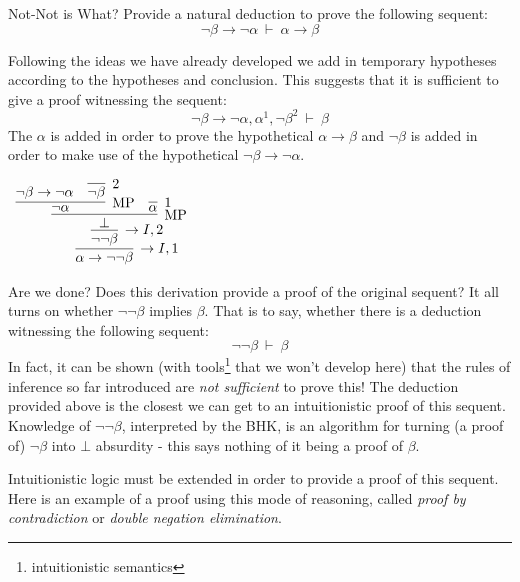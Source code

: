 \documentclass{book}
\begin{document}
    \begin{eg}{Not-Not is What?}
        Provide a natural deduction to prove the following sequent: $$\lnot\beta \to \lnot\alpha \ \vdash \ \alpha \to \beta$$

        Following the ideas we have already developed we add in temporary hypotheses according to the hypotheses and conclusion. This suggests that it is sufficient to give a proof witnessing the sequent: $$\lnot\beta \to \lnot\alpha, \alpha^{1}, \lnot\beta^{2} \ \vdash \ \beta$$ The $\alpha$ is added in order to prove the hypothetical $\alpha\to\beta$ and $\lnot\beta$ is added in order to make use of the hypothetical $\lnot\beta\to\lnot\alpha$. 

        \begin{center}
            $\begin{array}{c}
                \infer[\to I,1]{\alpha \to \lnot\lnot\beta}
                    {\infer[\to I,2]{\lnot\lnot\beta}
                        {\infer[\MP]{\bot}
                            {\infer[\MP]{\lnot\alpha}
                                {\lnot\beta \to \lnot\alpha
                                &
                                \infer[2]{\lnot\beta}
                                    {}}
                            &
                            \infer[1]{\alpha}
                                {}}}}
            \end{array}$
        \end{center}
    \end{eg}

    Are we done? Does this derivation provide a proof of the original sequent? It all turns on whether $\lnot\lnot\beta$ implies $\beta$. That is to say, whether there is a deduction witnessing the following sequent: $$\lnot\lnot\beta \ \vdash \ \beta$$ In fact, it can be shown (with tools\footnote{intuitionistic semantics} that we won't develop here) that the rules of inference so far introduced are \emph{not sufficient} to prove this! The deduction provided above is the closest we can get to an intuitionistic proof of this sequent. Knowledge of $\lnot\lnot\beta$, interpreted by the BHK, is an algorithm for turning (a proof of) $\lnot\beta$ into $\bot$ absurdity - this says nothing of it being a proof of $\beta$.

    Intuitionistic logic must be extended in order to provide a proof of this sequent. Here is an example of a proof using this mode of reasoning, called \emph{proof by contradiction} or \emph{double negation elimination}.
\end{document}
